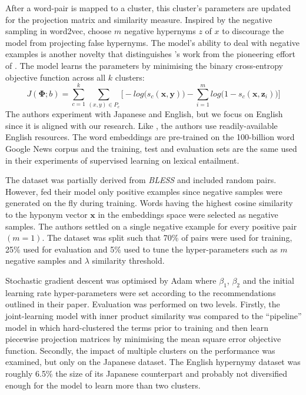 After a word-pair is mapped to a cluster, this cluster’s parameters are updated for the projection matrix and similarity measure.  Inspired by the negative sampling in word2vec, \citeauthor{yamane2016distributional} choose $m$ negative hypernyms $z$ of $x$ to discourage the model from projecting false hypernyms. The model’s ability to deal with negative examples is another novelty that distinguishes \citeauthor{yamane2016distributional}'s work from the pioneering effort of \citep{Fu2014}. The model learns the parameters by minimising the binary cross-entropy objective function across all $k$ clusters:
\[J(\bm{\Phi}; b) = \sum_{c=1}^{k} \sum_{(x,y) \in P_c} \Big[ -log \big(s_c(\bm{x}, \bm{y}) \big) - \sum_{i=1}^{m} log \big(1 - s_c(\bm{x}, \bm{z}_i) \big) \Big]\]
The authors experiment with Japanese and English, but we focus on English since it is aligned with our research.  Like \citep{ustalov2017negative}, the authors use readily-available English resources.  The word embeddings are pre-trained on the 100-billion word Google News corpus \citep{mikolov2013efficient} and the training, test and evaluation sets are the same \citep{baroni2012entailment} used in their experiments of supervised learning on lexical entailment.

The \citep{baroni2012entailment} dataset was partially derived from \textit{BLESS} \citep{Baroni2011} and included random pairs.  However, \citeauthor{yamane2016distributional} fed their model only positive examples since negative samples were generated on the fly during training.  Words having the highest cosine similarity to the hyponym vector $\bm{x}$ in the embeddings space were selected as negative samples.  The authors settled on a single negative example for every positive pair $(m=1)$.  The dataset was split such that 70\% of pairs were used for training, 25\% used for evaluation and 5\% used to tune the hyper-parameters such as $m$ negative samples and $\lambda$ similarity threshold.

Stochastic gradient descent was optimised by Adam \citep{kingma2014adam} where $\beta_1$, $\beta_2$ and the initial learning rate hyper-parameters were set according to the recommendations outlined in their paper.  Evaluation was performed on two levels.  Firstly, the joint-learning model with inner product similarity was compared to the “pipeline” model in \citep{Fu2014} which hard-clustered the terms prior to training and then learn piecewise projection matrices by minimising the mean square error objective function.  Secondly, the impact of multiple clusters on the performance was examined, but only on the Japanese dataset.  The English hypernymy dataset was roughly 6.5\% the size of its Japanese counterpart and probably not diversified enough for the model to learn more than two clusters. 

